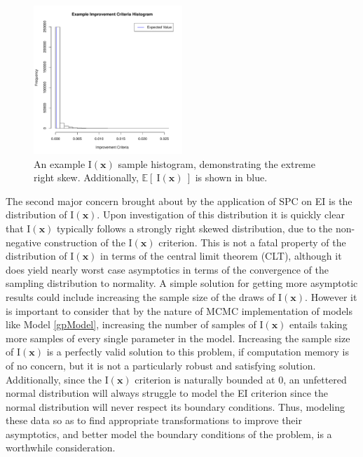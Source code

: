 \documentclass[12pt]{article}
\def \Eix {
	\mathbb{E}\left[~\text{I}(\bm{x})~\right]
}
\def \ix {
	\text{I}(\bm{x})
}
\begin{document}
	\begin{figure}
	\vspace{-1.1cm}
	\begin{center}
	\includegraphics[width=0.5\textwidth]{./figures/exampleIHist.pdf}
	\end{center}
	\vspace{-0.85cm}
	\caption{An example $\ix$ sample histogram, demonstrating the extreme right skew. Additionally, $\Eix$ is shown in blue.}
	\label{IxEX}
	\end{figure}

	The second major concern brought about by the application of SPC on EI is the distribution of $\ix$.
	Upon investigation of this distribution it is quickly clear that $\ix$ typically follows a strongly right skewed distribution, due to the non-negative construction of the $\ix$ criterion.
	This is not a fatal property of the distribution of $\ix$ in terms of the central limit theorem (CLT), although it does yield nearly worst case asymptotics in terms of the convergence of the sampling distribution to normality.
	A simple solution for getting more asymptotic results could include increasing the sample size of the draws of $\ix$.
	However it is important to consider that by the nature of MCMC implementation of models like Model \ref{gpModel}, increasing the number of samples of $\ix$ entails taking more samples of every single parameter in the model.
	Increasing the sample size of $\ix$ is a perfectly valid solution to this problem, if computation memory is of no concern, but it is not a particularly robust and satisfying solution.
	Additionally, since the $\ix$ criterion is naturally bounded at 0, an unfettered normal distribution will always struggle to model the EI criterion since the normal distribution will never respect its boundary conditions.
	Thus, modeling these data so as to find appropriate transformations to improve their asymptotics, and better model the boundary conditions of the problem, is a worthwhile consideration. 
	
\end{document}
